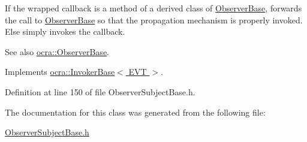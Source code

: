 If the wrapped callback is a method of a derived class of \hyperlink{classocra_1_1ObserverBase}{Observer\+Base}, forwards the call to \hyperlink{classocra_1_1ObserverBase}{Observer\+Base} so that the propagation mechanism is properly invoked. Else simply invokes the callback. \begin{DoxySeeAlso}{See also}
\hyperlink{classocra_1_1ObserverBase}{ocra\+::\+Observer\+Base}. 
\end{DoxySeeAlso}


Implements \hyperlink{classocra_1_1InvokerBase_ae4d7537a1b2c0aa9b5188c5da8423289}{ocra\+::\+Invoker\+Base$<$ E\+V\+T $>$}.



Definition at line 150 of file Observer\+Subject\+Base.\+h.



The documentation for this class was generated from the following file\+:\begin{DoxyCompactItemize}
\item 
\hyperlink{ObserverSubjectBase_8h}{Observer\+Subject\+Base.\+h}\end{DoxyCompactItemize}
